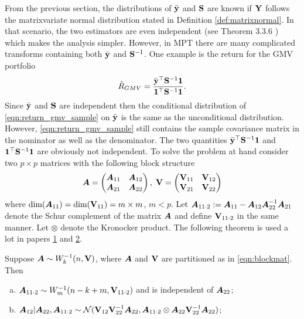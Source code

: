 \documentclass[12pt, oneside]{book}\usepackage{knitr}
\begin{document}
{From the previous section, the distributions of $\bar{\mathbf{y}}$ and $\mathbf{S}$ are known if $\mathbf{Y}$ follows the matrixvariate normal distribution stated in Definition \ref{def:matrixnormal}. 
In that scenario, the two estimators are even independent (see Theorem 3.3.6 \citet{GuptaNagar2000}) which makes the analysis simpler.
However, in MPT there are many complicated transforms containing both $\bar{\mathbf{y}}$ and $\mathbf{S}^{-1}$.
One example is the return for the GMV portfolio
\begin{equation}\label{eqn:return_gmv_sample}
\hat{R}_{GMV}=\frac{\bar{\mathbf{y}}^\top\mathbf{S}^{-1}\mathbf{1}}{\mathbf{1}^\top\mathbf{S}^{-1}\mathbf{1}}.
\end{equation}
Since $\bar{\mathbf{y}}$ and $\mathbf{S}$ are independent then the conditional distribution of \eqref{eqn:return_gmv_sample} on $\bar{\mathbf{y}}$ is the same as the unconditional distribution.
However, \eqref{eqn:return_gmv_sample} still contains the sample covariance matrix in the nominator as well as the denominator.
The two quantities $\bar{\mathbf{y}}^\top\mathbf{S}^{-1}\mathbf{1}$ and $\mathbf{1}^\top\mathbf{S}^{-1}\mathbf{1}$ are obviously not independent.
To solve the problem at hand consider two $p\times p$ matrices with the following block structure 
\begin{equation}\label{eqn:blockmat}
\mbox{\boldmath$A$} = \begin{pmatrix}
       \mbox{\boldmath$A$}_{11} & \mbox{\boldmath$A$}_{12} \\
       \mbox{\boldmath$A$}_{21} & \mbox{\boldmath$A$}_{22}
      \end{pmatrix},\;
\mathbf{V} = \begin{pmatrix}
           \mathbf{V}_{11} & \mathbf{V}_{12} \\
           \mathbf{V}_{21} & \mathbf{V}_{22}
          \end{pmatrix}
\end{equation}
where $\text{dim}(\mbox{\boldmath$A$}_{11}) = \text{dim}(\mathbf{V}_{11})= m \times m$, $m<p$. 
Let $\mbox{\boldmath$A$}_{11\cdot 2} := \mbox{\boldmath$A$}_{11} - \mbox{\boldmath$A$}_{12} \mbox{\boldmath$A$}_{22}^{-1} \mbox{\boldmath$A$}_{21}$ denote the Schur complement of the matrix $\mbox{\boldmath$A$}$ and define $\mathbf{V}_{11\cdot 2}$ in the same manner. 
Let $\otimes$ denote the Kronocker product. 
The following theorem is used a lot in papers \hyperref[sec:paper2]{1} and \hyperref[sec:paper2]{2}.
\begin{theorem}\label{thrm:invWis}
 Suppose $\mbox{\boldmath$A$} \sim W^{-1}_k(n, \mathbf{V})$, where $\mbox{\boldmath$A$}$ and $\mathbf{V}$ are partitioned as in \eqref{eqn:blockmat}. Then
 \begin{enumerate}[(a)]
	\item $\mbox{\boldmath$A$}_{11\cdot 2} \sim W^{-1}_m(n-k+m, \mathbf{V}_{11\cdot 2})$ and is independent of $\mbox{\boldmath$A$}_{22}$;
 	\item $\mbox{\boldmath$A$}_{12} | \mbox{\boldmath$A$}_{22}, \mbox{\boldmath$A$}_{11\cdot 2} \sim \mathcal{N}(\mathbf{V}_{12}\mathbf{V}^{-1}_{22} \mbox{\boldmath$A$}_{22}, \mbox{\boldmath$A$}_{11\cdot 2} \otimes \mbox{\boldmath$A$}_{22} \mathbf{V}^{-1}_{22} \mbox{\boldmath$A$}_{22})$;

\end{enumerate}
\end{theorem}}
\end{document}

